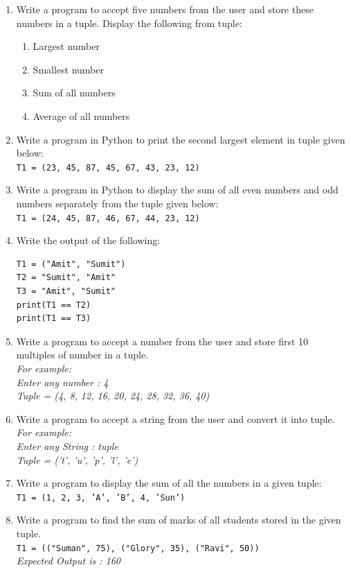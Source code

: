 \documentclass[11pt,a4paper]{article}
\begin{document}
\begin{enumerate}[label=\textbf{Q\arabic*.}]
\item Write a program to accept five numbers from the user and store these numbers in a tuple. Display the following from tuple:
\begin{enumerate}
    \item Largest number
    \item Smallest number
    \item Sum of all numbers
    \item Average of all numbers
\end{enumerate}

\item Write a program in Python to print the second largest element in tuple given below:\\
\texttt{T1 = (23, 45, 87, 45, 67, 43, 23, 12)}

\item Write a program in Python to display the sum of all even numbers and odd numbers separately from the tuple given below:\\
\texttt{T1 = (24, 45, 87, 46, 67, 44, 23, 12)}

\item Write the output of the following:
\begin{lstlisting}
T1 = ("Amit", "Sumit")
T2 = "Sumit", "Amit"
T3 = "Amit", "Sumit"
print(T1 == T2)
print(T1 == T3)
\end{lstlisting}

\item Write a program to accept a number from the user and store first 10 multiples of number in a tuple.\\
\textit{For example:}\\
\textit{Enter any number : 4}\\
\textit{Tuple = (4, 8, 12, 16, 20, 24, 28, 32, 36, 40)}

\item Write a program to accept a string from the user and convert it into tuple.\\
\textit{For example:}\\
\textit{Enter any String : tuple}\\
\textit{Tuple = ('t', 'u', 'p', 'l', 'e')}

\item Write a program to display the sum of all the numbers in a given tuple:\\
\texttt{T1 = (1, 2, 3, 'A', 'B', 4, 'Sun')}

\item Write a program to find the sum of marks of all students stored in the given tuple.\\
\texttt{T1 = (("Suman", 75), ("Glory", 35), ("Ravi", 50))}\\
\textit{Expected Output is : 160}


\end{enumerate}
\end{document}
